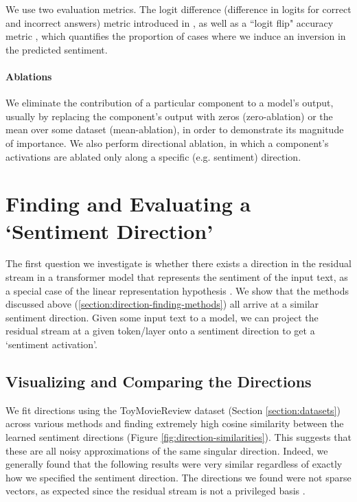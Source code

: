 \documentclass{article} %
\begin{document}
We use two evaluation metrics. The logit difference (difference in logits for correct and incorrect answers) metric introduced in \cite{ioi}, as well as a ``logit flip" accuracy metric \citep{pmlr-v162-geiger22a}, which quantifies the proportion of cases where we induce an inversion in the predicted sentiment.


\paragraph{Ablations}\label{method:ablation} We eliminate the contribution of a particular component to a model's output, usually by replacing the component's output with zeros (zero-ablation) or the mean over some dataset (mean-ablation), in order to demonstrate its magnitude of importance. We also perform directional ablation, in which a component's activations are ablated only along a specific (e.g. sentiment) direction.



\section{Finding and Evaluating a `Sentiment Direction'} \label{section:direction-finding}

The first question we investigate is whether there exists a direction in the residual stream in a transformer model that represents the sentiment of the input text, as a special case of the linear representation hypothesis \citep{mikolov-etal-2013-linguistic}. We show that the methods discussed above (\ref{section:direction-finding-methods}) all arrive at a similar sentiment direction. Given some input text to a model, we can project the residual stream at a given token/layer onto a sentiment direction to get a `sentiment activation'.

\subsection{Visualizing and Comparing the Directions}
We fit directions using the ToyMovieReview dataset (Section \ref{section:datasets}) across various methods and finding extremely high cosine similarity between the learned sentiment directions (Figure \ref{fig:direction-similarities}).
This suggests that these are all noisy approximations of the same singular direction. Indeed, we generally found that the following results were very similar regardless of exactly how we specified the sentiment direction. The directions we found were not sparse vectors, as expected since the residual stream is not a privileged basis \citep{mathematicalframework}.
\end{document}
